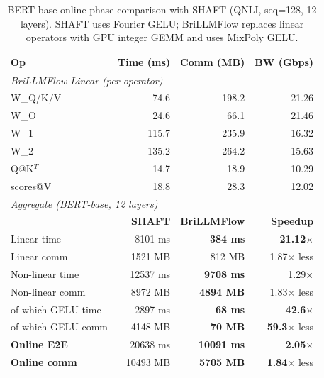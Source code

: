 \begin{table}[t]
\centering
\caption{BERT-base online phase comparison with SHAFT (QNLI, seq=128, 12 layers). SHAFT uses Fourier GELU; BriLLMFlow replaces linear operators with GPU integer GEMM and uses MixPoly GELU.}
\label{tab:bert_shaft_comparison}
\setlength{\tabcolsep}{4pt}
\footnotesize
\begin{tabular}{lrrr}
\toprule
\textbf{Op} & \textbf{Time (ms)} & \textbf{Comm (MB)} & \textbf{BW (Gbps)} \\
\midrule
\multicolumn{4}{l}{\textit{BriLLMFlow Linear (per-operator)}} \\
W\_Q/K/V    & 74.6 & 198.2 & 21.26 \\
W\_O        & 24.6 & 66.1 & 21.46 \\
W\_1        & 115.7 & 235.9 & 16.32 \\
W\_2        & 135.2 & 264.2 & 15.63 \\
Q@K$^T$     & 14.7 & 18.9 & 10.29 \\
scores@V    & 18.8 & 28.3 & 12.02 \\
\midrule
\multicolumn{4}{l}{\textit{Aggregate (BERT-base, 12 layers)}} \\
                       & \textbf{SHAFT} & \textbf{BriLLMFlow} & \textbf{Speedup} \\
Linear time            & 8101 ms & \textbf{384 ms} & \textbf{21.12}$\times$ \\
Linear comm            & 1521 MB & 812 MB & 1.87$\times$ less \\
Non-linear time        & 12537 ms & \textbf{9708 ms} & 1.29$\times$ \\
Non-linear comm        & 8972 MB & \textbf{4894 MB} & 1.83$\times$ less \\
\quad of which GELU time & 2897 ms & \textbf{68 ms} & \textbf{42.6}$\times$ \\
\quad of which GELU comm & 4148 MB & \textbf{70 MB} & \textbf{59.3}$\times$ less \\
\midrule
\textbf{Online E2E}    & 20638 ms & \textbf{10091 ms} & \textbf{2.05}$\times$ \\
\textbf{Online comm}   & 10493 MB & \textbf{5705 MB} & \textbf{1.84}$\times$ less \\
\bottomrule
\end{tabular}
\end{table}
